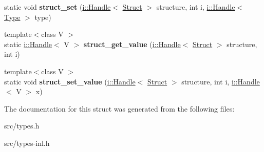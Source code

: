 \begin{DoxyCompactItemize}
\item 
\hypertarget{structv8_1_1internal_1_1_heap_type_config_afb16febe48d0e735cc4fdd86c2335208}{}static void {\bfseries struct\+\_\+set} (\hyperlink{classv8_1_1internal_1_1_handle}{i\+::\+Handle}$<$ \hyperlink{classv8_1_1internal_1_1_fixed_array}{Struct} $>$ structure, int i, \hyperlink{classv8_1_1internal_1_1_handle}{i\+::\+Handle}$<$ \hyperlink{classv8_1_1internal_1_1_type_impl}{Type} $>$ type)\label{structv8_1_1internal_1_1_heap_type_config_afb16febe48d0e735cc4fdd86c2335208}

\item 
\hypertarget{structv8_1_1internal_1_1_heap_type_config_ae08619c642d084f452592ff1e520abef}{}{\footnotesize template$<$class V $>$ }\\static \hyperlink{classv8_1_1internal_1_1_handle}{i\+::\+Handle}$<$ V $>$ {\bfseries struct\+\_\+get\+\_\+value} (\hyperlink{classv8_1_1internal_1_1_handle}{i\+::\+Handle}$<$ \hyperlink{classv8_1_1internal_1_1_fixed_array}{Struct} $>$ structure, int i)\label{structv8_1_1internal_1_1_heap_type_config_ae08619c642d084f452592ff1e520abef}

\item 
\hypertarget{structv8_1_1internal_1_1_heap_type_config_aecb2ff7689c92cbc8386c9f3e42ab489}{}{\footnotesize template$<$class V $>$ }\\static void {\bfseries struct\+\_\+set\+\_\+value} (\hyperlink{classv8_1_1internal_1_1_handle}{i\+::\+Handle}$<$ \hyperlink{classv8_1_1internal_1_1_fixed_array}{Struct} $>$ structure, int i, \hyperlink{classv8_1_1internal_1_1_handle}{i\+::\+Handle}$<$ V $>$ x)\label{structv8_1_1internal_1_1_heap_type_config_aecb2ff7689c92cbc8386c9f3e42ab489}

\end{DoxyCompactItemize}


The documentation for this struct was generated from the following files\+:\begin{DoxyCompactItemize}
\item 
src/types.\+h\item 
src/types-\/inl.\+h\end{DoxyCompactItemize}
